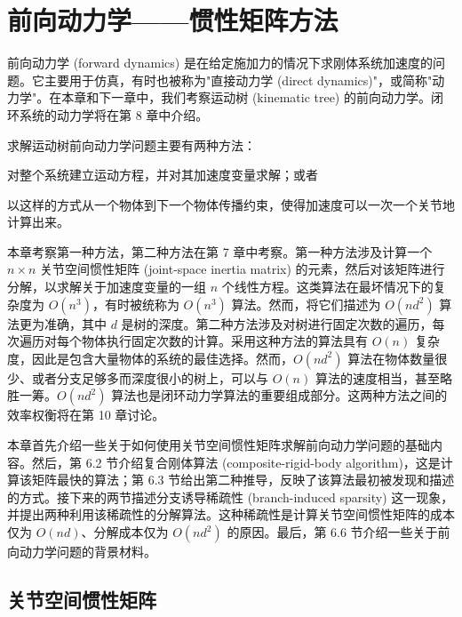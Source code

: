 \documentclass[10pt,a4paper]{book}
\theoremstyle{thmstyle} %
\theoremstyle{defstyle} %
\theoremstyle{prostyle} %
\begin{document}
\chapter{前向动力学——惯性矩阵方法}









前向动力学 (forward dynamics) 是在给定施加力的情况下求刚体系统加速度的问题。它主要用于仿真，有时也被称为"直接动力学 (direct dynamics)"，或简称"动力学"。在本章和下一章中，我们考察运动树 (kinematic tree) 的前向动力学。闭环系统的动力学将在第 8 章中介绍。



求解运动树前向动力学问题主要有两种方法：



对整个系统建立运动方程，并对其加速度变量求解；或者



以这样的方式从一个物体到下一个物体传播约束，使得加速度可以一次一个关节地计算出来。



本章考察第一种方法，第二种方法在第 7 章中考察。第一种方法涉及计算一个 $n \times n$ 关节空间惯性矩阵 (joint-space inertia matrix) 的元素，然后对该矩阵进行分解，以求解关于加速度变量的一组 $n$ 个线性方程。这类算法在最坏情况下的复杂度为 $O(n^3)$，有时被统称为 $O(n^3)$ 算法。然而，将它们描述为 $O(nd^2)$ 算法更为准确，其中 $d$ 是树的深度。第二种方法涉及对树进行固定次数的遍历，每次遍历对每个物体执行固定次数的计算。采用这种方法的算法具有 $O(n)$ 复杂度，因此是包含大量物体的系统的最佳选择。然而，$O(nd^2)$ 算法在物体数量很少、或者分支足够多而深度很小的树上，可以与 $O(n)$ 算法的速度相当，甚至略胜一筹。$O(nd^2)$ 算法也是闭环动力学算法的重要组成部分。这两种方法之间的效率权衡将在第 10 章讨论。



本章首先介绍一些关于如何使用关节空间惯性矩阵求解前向动力学问题的基础内容。然后，第 6.2 节介绍复合刚体算法 (composite-rigid-body algorithm)，这是计算该矩阵最快的算法；第 6.3 节给出第二种推导，反映了该算法最初被发现和描述的方式。接下来的两节描述分支诱导稀疏性 (branch-induced sparsity) 这一现象，并提出两种利用该稀疏性的分解算法。这种稀疏性是计算关节空间惯性矩阵的成本仅为 $O(nd)$、分解成本仅为 $O(nd^2)$ 的原因。最后，第 6.6 节介绍一些关于前向动力学问题的背景材料。



\section{关节空间惯性矩阵}
\end{document}
